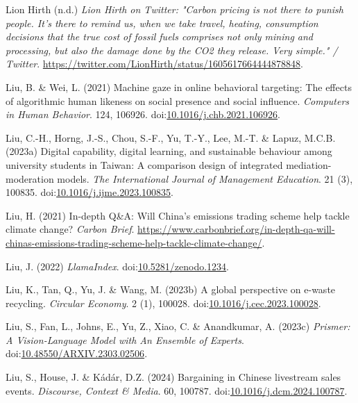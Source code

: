 \documentclass[
  letterpaper,
  DIV=11,
  numbers=noendperiod]{scrartcl}
\newlength{\cslhangindent}
\newenvironment{CSLReferences}[2] %
 {\begin{list}{}{%
  \setlength{\itemindent}{0pt}
  \setlength{\leftmargin}{0pt}
  \setlength{\parsep}{0pt}
  \ifodd #1
   \setlength{\leftmargin}{\cslhangindent}
   \setlength{\itemindent}{-1\cslhangindent}
  \fi
  \setlength{\itemsep}{#2\baselineskip}}}
 {\end{list}}
\begin{document}
\begin{CSLReferences}{0}{1}
Lion Hirth (n.d.) \emph{Lion {Hirth} on {Twitter}: "{Carbon} pricing is
not there to punish people. {It}'s there to remind us, when we take
travel, heating, consumption decisions that the true cost of fossil
fuels comprises not only mining and processing, but also the damage done
by the {CO2} they release. {Very} simple." / {Twitter}}.
\url{https://twitter.com/LionHirth/status/1605617664444878848}.

Liu, B. \& Wei, L. (2021) Machine gaze in online behavioral targeting:
{The} effects of algorithmic human likeness on social presence and
social influence. \emph{Computers in Human Behavior}. 124, 106926.
doi:\href{https://doi.org/10.1016/j.chb.2021.106926}{10.1016/j.chb.2021.106926}.

Liu, C.-H., Horng, J.-S., Chou, S.-F., Yu, T.-Y., Lee, M.-T. \& Lapuz,
M.C.B. (2023a) Digital capability, digital learning, and sustainable
behaviour among university students in {Taiwan}: {A} comparison design
of integrated mediation-moderation models. \emph{The International
Journal of Management Education}. 21 (3), 100835.
doi:\href{https://doi.org/10.1016/j.ijme.2023.100835}{10.1016/j.ijme.2023.100835}.

Liu, H. (2021) In-depth {Q}\&{A}: {Will China}'s emissions trading
scheme help tackle climate change? \emph{Carbon Brief}.
\url{https://www.carbonbrief.org/in-depth-qa-will-chinas-emissions-trading-scheme-help-tackle-climate-change/}.

Liu, J. (2022) \emph{{LlamaIndex}}.
doi:\href{https://doi.org/10.5281/zenodo.1234}{10.5281/zenodo.1234}.

Liu, K., Tan, Q., Yu, J. \& Wang, M. (2023b) A global perspective on
e-waste recycling. \emph{Circular Economy}. 2 (1), 100028.
doi:\href{https://doi.org/10.1016/j.cec.2023.100028}{10.1016/j.cec.2023.100028}.

Liu, S., Fan, L., Johns, E., Yu, Z., Xiao, C. \& Anandkumar, A. (2023c)
\emph{Prismer: {A Vision-Language Model} with {An Ensemble} of
{Experts}}.
doi:\href{https://doi.org/10.48550/ARXIV.2303.02506}{10.48550/ARXIV.2303.02506}.

Liu, S., House, J. \& Kádár, D.Z. (2024) Bargaining in {Chinese}
livestream sales events. \emph{Discourse, Context \& Media}. 60, 100787.
doi:\href{https://doi.org/10.1016/j.dcm.2024.100787}{10.1016/j.dcm.2024.100787}.


\end{CSLReferences}
\end{document}
